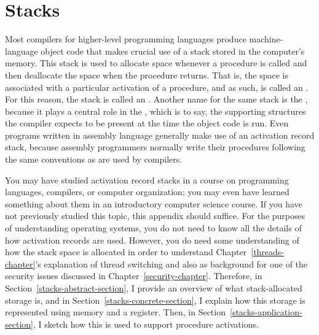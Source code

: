 \chapter{Stacks}\label{stacks-appendix}

Most compilers for higher-level programming languages produce
machine-language object code that makes crucial use of a stack stored
in the computer's memory.  This stack is used to allocate space
whenever a procedure is called and then deallocate the space when the
procedure returns.  That is, the space is associated with a particular
activation of a procedure, and as such, is called an .  For this reason, the stack is called an
.  Another name for the same stack
is the , because it plays a central role in
the , which is to say, the supporting
structures the compiler expects to be present at the time the object
code is run.  Even programs written in assembly language generally
make use of an activation record stack, because assembly programmers
normally write their procedures following the same conventions as are
used by compilers.

You may have studied activation record stacks in a course on
programming languages, compilers, or computer organization; you may
even have learned something about them in an introductory computer
science course.  If you have not previously studied this topic, this appendix should suffice.  For the
purposes of understanding operating systems, you do not need to know
all the details of how activation records are used.  However, you do
need some understanding of how the stack space is allocated in order
to understand Chapter~\ref{threads-chapter}'s explanation of thread
switching and also as background for one of the security issues
discussed in Chapter~\ref{security-chapter}.  Therefore, in
Section~\ref{stacks-abstract-section}, I provide an overview of what
stack-allocated storage is, and in Section~\ref{stacks-concrete-section}, I
explain how this storage is represented using memory and a register.
Then, in Section~\ref{stacks-application-section}, I sketch how this is
used to support procedure activations.

